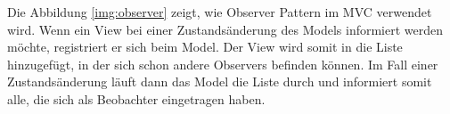 Die Abbildung \ref{img:observer} zeigt, wie Observer Pattern im MVC verwendet wird. Wenn ein View bei einer Zustandsänderung des Models informiert werden möchte, registriert er sich beim Model. Der View wird somit in die Liste hinzugefügt, in der sich schon andere Observers befinden können. Im Fall einer Zustandsänderung läuft dann das Model die Liste durch und informiert somit alle, die sich als Beobachter eingetragen haben.







































